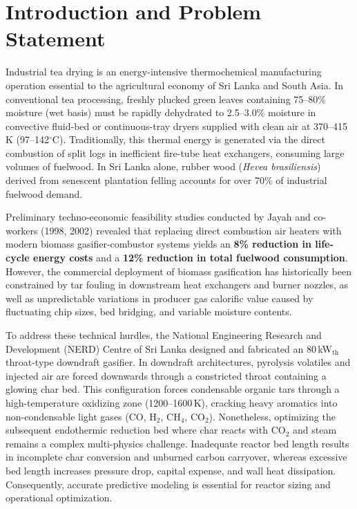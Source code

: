 \documentclass[11pt,a4paper]{article}
\begin{document}
\section{Introduction and Problem Statement}
Industrial tea drying is an energy-intensive thermochemical manufacturing operation essential to the agricultural economy of Sri Lanka and South Asia. In conventional tea processing, freshly plucked green leaves containing 75--80\% moisture (wet basis) must be rapidly dehydrated to 2.5--3.0\% moisture in convective fluid-bed or continuous-tray dryers supplied with clean air at 370--415\,K (97--142$^\circ$C). Traditionally, this thermal energy is generated via the direct combustion of split logs in inefficient fire-tube heat exchangers, consuming large volumes of fuelwood. In Sri Lanka alone, rubber wood (\textit{Hevea brasiliensis}) derived from senescent plantation felling accounts for over 70\% of industrial fuelwood demand.

Preliminary techno-economic feasibility studies conducted by Jayah and co-workers (1998, 2002) revealed that replacing direct combustion air heaters with modern biomass gasifier-combustor systems yields an \textbf{8\% reduction in life-cycle energy costs} and a \textbf{12\% reduction in total fuelwood consumption}. However, the commercial deployment of biomass gasification has historically been constrained by tar fouling in downstream heat exchangers and burner nozzles, as well as unpredictable variations in producer gas calorific value caused by fluctuating chip sizes, bed bridging, and variable moisture contents.

To address these technical hurdles, the National Engineering Research and Development (NERD) Centre of Sri Lanka designed and fabricated an 80\,kW$_{\text{th}}$ throat-type downdraft gasifier. In downdraft architectures, pyrolysis volatiles and injected air are forced downwards through a constricted throat containing a glowing char bed. This configuration forces condensable organic tars through a high-temperature oxidizing zone (1200--1600\,K), cracking heavy aromatics into non-condensable light gases (CO, H$_2$, CH$_4$, CO$_2$). Nonetheless, optimizing the subsequent endothermic reduction bed where char reacts with CO$_2$ and steam remains a complex multi-physics challenge. Inadequate reactor bed length results in incomplete char conversion and unburned carbon carryover, whereas excessive bed length increases pressure drop, capital expense, and wall heat dissipation. Consequently, accurate predictive modeling is essential for reactor sizing and operational optimization.
\end{document}
